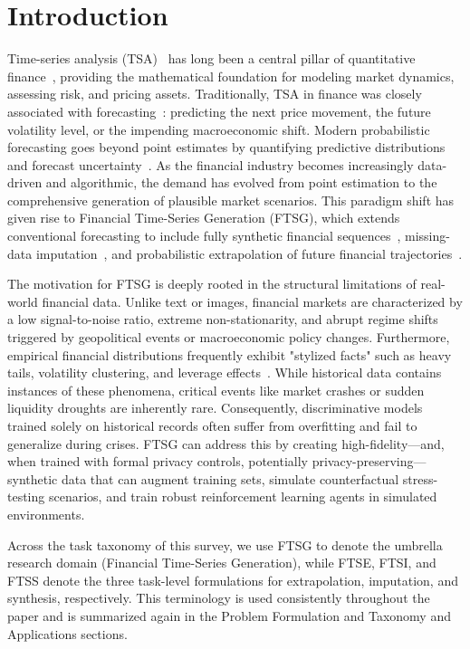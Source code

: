 \section{Introduction}
\label{sec:1}

Time-series analysis (TSA)~\citep{hamilton1994time,box2015time} has long been a central pillar of quantitative finance~\citep{campbell1997econometrics,tsay2010analysis}, providing the mathematical foundation for modeling market dynamics, assessing risk, and pricing assets. Traditionally, TSA in finance was closely associated with forecasting~\citep{hyndman2021forecasting}: predicting the next price movement, the future volatility level, or the impending macroeconomic shift. Modern probabilistic forecasting goes beyond point estimates by quantifying predictive distributions and forecast uncertainty~\citep{gneiting2014probabilistic}. As the financial industry becomes increasingly data-driven and algorithmic, the demand has evolved from point estimation to the comprehensive generation of plausible market scenarios. This paradigm shift has given rise to Financial Time-Series Generation (FTSG), which extends conventional forecasting to include fully synthetic financial sequences~\citep{Time-GAN,wiese2020,naritomi2020data}, missing-data imputation~\citep{yoon2018gain,tashiro2021csdi,wang2024cwgain}, and probabilistic extrapolation of future financial trajectories~\citep{rasul2021timegrad}.

The motivation for FTSG is deeply rooted in the structural limitations of real-world financial data. Unlike text or images, financial markets are characterized by a low signal-to-noise ratio, extreme non-stationarity, and abrupt regime shifts triggered by geopolitical events or macroeconomic policy changes. Furthermore, empirical financial distributions frequently exhibit "stylized facts" such as heavy tails, volatility clustering, and leverage effects~\citep{cont2001empirical}. While historical data contains instances of these phenomena, critical events like market crashes or sudden liquidity droughts are inherently rare. Consequently, discriminative models trained solely on historical records often suffer from overfitting and fail to generalize during crises. FTSG can address this by creating high-fidelity—and, when trained with formal privacy controls, potentially privacy-preserving—synthetic data that can augment training sets, simulate counterfactual stress-testing scenarios, and train robust reinforcement learning agents in simulated environments.

Across the task taxonomy of this survey, we use FTSG to denote the umbrella research domain (Financial Time-Series Generation), while FTSE, FTSI, and FTSS denote the three task-level formulations for extrapolation, imputation, and synthesis, respectively. This terminology is used consistently throughout the paper and is summarized again in the Problem Formulation and Taxonomy and Applications sections.

